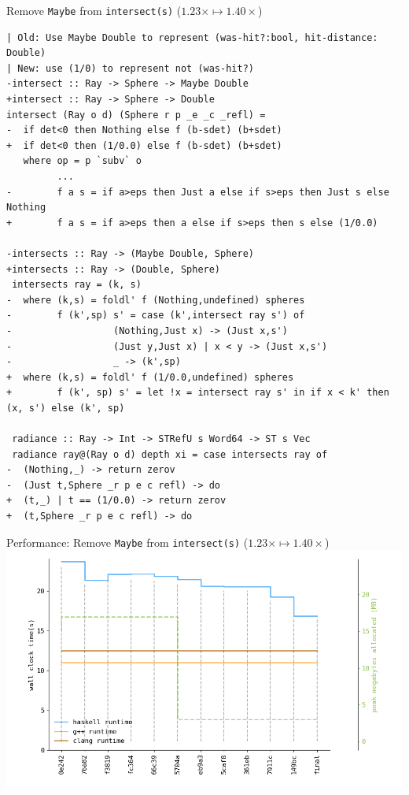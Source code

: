 \documentclass[8pt]{beamer}
\begin{document}
\begin{frame}[fragile]{Remove \texttt{Maybe} from \texttt{intersect(s)} ($1.23\times \mapsto 1.40\times$)}
\begin{verbatim}
| Old: Use Maybe Double to represent (was-hit?:bool, hit-distance: Double)
| New: use (1/0) to represent not (was-hit?)
-intersect :: Ray -> Sphere -> Maybe Double
+intersect :: Ray -> Sphere -> Double
intersect (Ray o d) (Sphere r p _e _c _refl) =
-  if det<0 then Nothing else f (b-sdet) (b+sdet)
+  if det<0 then (1/0.0) else f (b-sdet) (b+sdet)
   where op = p `subv` o
         ...
-        f a s = if a>eps then Just a else if s>eps then Just s else Nothing
+        f a s = if a>eps then a else if s>eps then s else (1/0.0)

-intersects :: Ray -> (Maybe Double, Sphere)
+intersects :: Ray -> (Double, Sphere)
 intersects ray = (k, s)
-  where (k,s) = foldl' f (Nothing,undefined) spheres
-        f (k',sp) s' = case (k',intersect ray s') of
-                  (Nothing,Just x) -> (Just x,s')
-                  (Just y,Just x) | x < y -> (Just x,s')
-                  _ -> (k',sp)
+  where (k,s) = foldl' f (1/0.0,undefined) spheres
+        f (k', sp) s' = let !x = intersect ray s' in if x < k' then (x, s') else (k', sp)
 
 radiance :: Ray -> Int -> STRefU s Word64 -> ST s Vec
 radiance ray@(Ray o d) depth xi = case intersects ray of
-  (Nothing,_) -> return zerov
-  (Just t,Sphere _r p e c refl) -> do
+  (t,_) | t == (1/0.0) -> return zerov
+  (t,Sphere _r p e c refl) -> do
\end{verbatim}

\end{frame}

\begin{frame}[fragile]{Performance: Remove \texttt{Maybe} from \texttt{intersect(s)} ($1.23\times \mapsto  1.40\times$)}
\includegraphics[height=0.6\textwidth]{perfdata-upto-149bc-gen.png}
\end{frame}
\end{document}
